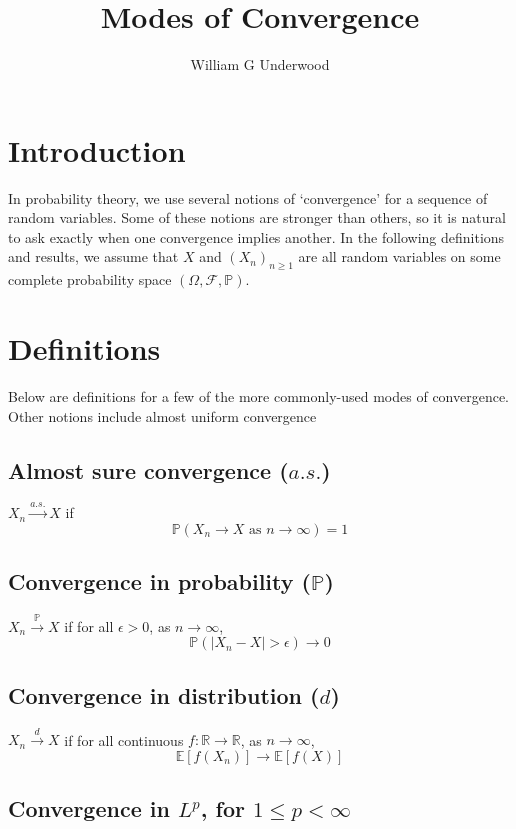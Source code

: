 \documentclass{article}
\title{Modes of Convergence}
\author{William G Underwood}
\begin{document}
\maketitle

\section{Introduction}

In probability theory, we use several notions of `convergence' for
a sequence of random variables.
Some of these notions are stronger than others, so it is natural to ask
exactly when one convergence implies another.
In the following definitions and results, we assume that $X$ and $(X_n)_{n \geq 1}$ are all
random variables on some complete probability space $(\Omega, \mathcal{F}, \mathbb{P})$.


\section{Definitions}

Below are definitions for a few of the more
commonly-used modes of convergence.
Other notions include
almost uniform convergence

\subsection*{Almost sure convergence ($a.s.$)}

$X_n \xrightarrow{a.s.} X$
if
$$\mathbb{P}(X_n \to X \text{ as } n \to \infty) = 1$$

\subsection*{Convergence in probability ($\mathbb{P}$)}

$X_n \xrightarrow{\mathbb{P}} X$
if for all $\epsilon > 0$,
as $n \to \infty$,
$$\mathbb{P}(|X_n - X| > \epsilon) \to 0$$

\subsection*{Convergence in distribution ($d$)}

$X_n \xrightarrow{d} X$
if for all continuous $f: \mathbb{R} \to \mathbb{R}$,
as $n \to \infty$,
$$\mathbb{E}[f(X_n)] \to \mathbb{E}[f(X)]$$

\subsection*{Convergence in $L^p$, for $1 \leq p < \infty$}
\end{document}
